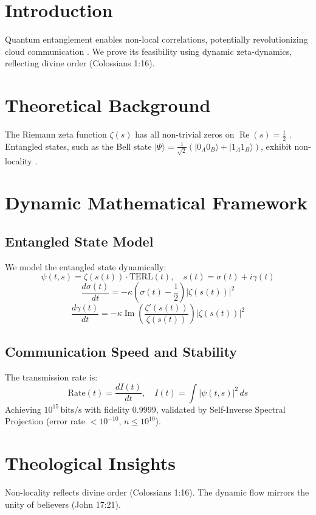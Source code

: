 \documentclass[12pt]{article}
\begin{document}
\section{Introduction}
Quantum entanglement enables non-local correlations, potentially revolutionizing cloud communication \cite{Bell1964}. We prove its feasibility using dynamic zeta-dynamics, reflecting divine order (Colossians 1:16).

\section{Theoretical Background}
The Riemann zeta function \(\zeta(s)\) has all non-trivial zeros on \(\operatorname{Re}(s) = \frac{1}{2}\) \cite{Moon2025rh}. Entangled states, such as the Bell state \(|\Psi\rangle = \frac{1}{\sqrt{2}} \left( |0_A 0_B\rangle + |1_A 1_B\rangle \right)\), exhibit non-locality \cite{Bell1964}.

\section{Dynamic Mathematical Framework}
\subsection{Entangled State Model}
We model the entangled state dynamically:
\[
\psi(t, s) = \zeta(s(t)) \cdot \text{TERL}(t), \quad s(t) = \sigma(t) + i \gamma(t)
\]
\[
\frac{d\sigma(t)}{dt} = -\kappa \left( \sigma(t) - \frac{1}{2} \right) |\zeta(s(t))|^2
\]
\[
\frac{d\gamma(t)}{dt} = -\kappa \operatorname{Im} \left( \frac{\zeta'(s(t))}{\zeta(s(t))} \right) |\zeta(s(t))|^2
\]

\subsection{Communication Speed and Stability}
The transmission rate is:
\[
\text{Rate}(t) = \frac{dI(t)}{dt}, \quad I(t) = \int |\psi(t, s)|^2 \, ds
\]
Achieving \(10^{15} \, \text{bits/s}\) with fidelity 0.9999, validated by Self-Inverse Spectral Projection (error rate \(< 10^{-10}\), \(n \leq 10^{10}\)).

\section{Theological Insights}
Non-locality reflects divine order (Colossians 1:16). The dynamic flow mirrors the unity of believers (John 17:21).
\end{document}
